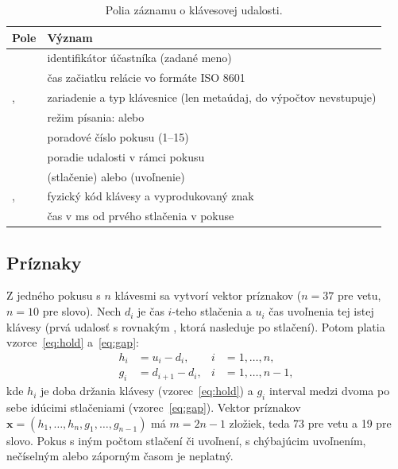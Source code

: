 \begin{table}[!htbp]
  \centering
  \small
  \caption{Polia záznamu o klávesovej udalosti.}
  \label{tab:format}
  \begin{tabularx}{\textwidth}{|l|Y|}
    \hline
     \textbf{Pole} & \textbf{Význam} \\
    \hline
     & identifikátor účastníka (zadané meno) \\
    \hline
     & čas začiatku relácie vo formáte ISO 8601 \\
    \hline
    ,  & zariadenie a typ klávesnice (len
      metaúdaj, do výpočtov nevstupuje) \\
    \hline
     & režim písania:  alebo  \\
    \hline
     & poradové číslo pokusu (1--15) \\
    \hline
     & poradie udalosti v rámci pokusu \\
    \hline
     &  (stlačenie) alebo  (uvoľnenie) \\
    \hline
    ,  & fyzický kód klávesy a vyprodukovaný znak \\
    \hline
     & čas v ms od prvého stlačenia v pokuse \\
    \hline
  \end{tabularx}
\end{table}

\subsection{Príznaky}
\label{sec:priznaky}

Z jedného pokusu s $n$ klávesmi sa vytvorí vektor príznakov ($n=37$ pre
vetu, $n=10$ pre slovo). Nech $d_i$ je
čas $i$-teho stlačenia a $u_i$ čas uvoľnenia tej istej klávesy (prvá udalosť
 s rovnakým , ktorá nasleduje po stlačení). Potom platia
vzorce~\eqref{eq:hold} a~\eqref{eq:gap}:
\begin{align}
  h_i &= u_i - d_i, & i &= 1,\dots,n, \label{eq:hold}\\
  g_i &= d_{i+1} - d_i, & i &= 1,\dots,n-1, \label{eq:gap}
\end{align}
kde $h_i$ je doba držania klávesy (vzorec~\eqref{eq:hold}) a $g_i$ interval medzi
dvoma po sebe idúcimi stlačeniami (vzorec~\eqref{eq:gap}). Vektor príznakov
$\mathbf{x} = (h_1,\dots,h_n,g_1,\dots,g_{n-1})$
má $m = 2n-1$ zložiek, teda 73 pre vetu a 19 pre slovo. Pokus s iným počtom stlačení či uvoľnení,
s chýbajúcim uvoľnením, nečíselným alebo záporným časom je neplatný.

